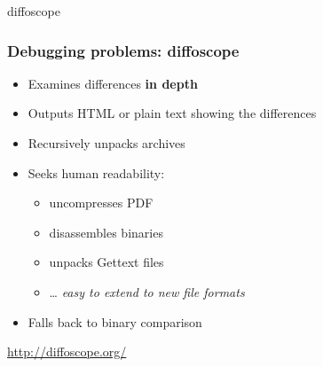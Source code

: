 \documentclass[14pt,aspectratio=169]{beamer}
\begin{document}
{
\begin{frame}{diffoscope}
 \frametitle{Debugging problems: diffoscope}

 \begin{itemize}
  \item Examines differences \textbf{in depth}
  \item Outputs HTML or plain text showing the differences
  \item Recursively unpacks archives
  \item Seeks human readability:
   \begin{itemize}
    \item uncompresses PDF
    \item disassembles binaries
    \item unpacks Gettext files
    \item … \textit{easy to extend to new file formats}
   \end{itemize}
  \item Falls back to binary comparison
 \end{itemize}
 \vfill
 \begin{center}
  \url{http://diffoscope.org/}
 \end{center}
\end{frame}
}
\end{document}
